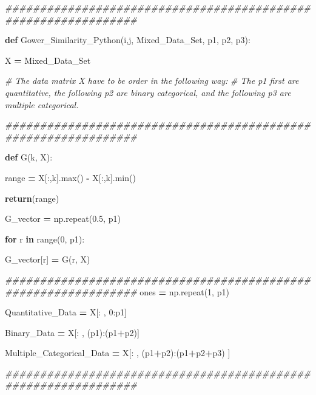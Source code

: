 \documentclass[
  11pt,
  a4paper,
]{article}
\newenvironment{Shaded}{\begin{snugshade}}{\end{snugshade}}
\newcommand{\BuiltInTok}[1]{#1}
\newcommand{\CommentTok}[1]{\textcolor[rgb]{0.56,0.35,0.01}{\textit{#1}}}
\newcommand{\ControlFlowTok}[1]{\textcolor[rgb]{0.13,0.29,0.53}{\textbf{#1}}}
\newcommand{\DecValTok}[1]{\textcolor[rgb]{0.00,0.00,0.81}{#1}}
\newcommand{\FloatTok}[1]{\textcolor[rgb]{0.00,0.00,0.81}{#1}}
\newcommand{\KeywordTok}[1]{\textcolor[rgb]{0.13,0.29,0.53}{\textbf{#1}}}
\newcommand{\NormalTok}[1]{#1}
\newcommand{\OperatorTok}[1]{\textcolor[rgb]{0.81,0.36,0.00}{\textbf{#1}}}
\begin{document}
\begin{Shaded}
\begin{Highlighting}[]
\CommentTok{\#\#\#\#\#\#\#\#\#\#\#\#\#\#\#\#\#\#\#\#\#\#\#\#\#\#\#\#\#\#\#\#\#\#\#\#\#\#\#\#\#\#\#\#\#\#\#\#\#\#\#\#\#\#\#\#\#\#\#\#\#\#\#}


        \KeywordTok{def}\NormalTok{ Gower\_Similarity\_Python(i,j, Mixed\_Data\_Set, p1, p2, p3):}

\NormalTok{            X }\OperatorTok{=}\NormalTok{ Mixed\_Data\_Set}

   \CommentTok{\# The data matrix X have to be order in the following way:}
   \CommentTok{\# The p1 first are quantitative, the following p2 are binary categorical, and the following p3 are multiple categorical.}

\CommentTok{\#\#\#\#\#\#\#\#\#\#\#\#\#\#\#\#\#\#\#\#\#\#\#\#\#\#\#\#\#\#\#\#\#\#\#\#\#\#\#\#\#\#\#\#\#\#\#\#\#\#\#\#\#\#\#\#\#\#\#\#\#\#\#}
        
            \KeywordTok{def}\NormalTok{ G(k, X):}

                \BuiltInTok{range} \OperatorTok{=}\NormalTok{ X[:,k].}\BuiltInTok{max}\NormalTok{() }\OperatorTok{{-}}\NormalTok{ X[:,k].}\BuiltInTok{min}\NormalTok{() }

                \ControlFlowTok{return}\NormalTok{(}\BuiltInTok{range}\NormalTok{)}

\NormalTok{            G\_vector }\OperatorTok{=}\NormalTok{ np.repeat(}\FloatTok{0.5}\NormalTok{, p1)}

            \ControlFlowTok{for}\NormalTok{ r }\KeywordTok{in} \BuiltInTok{range}\NormalTok{(}\DecValTok{0}\NormalTok{, p1):}

\NormalTok{                G\_vector[r] }\OperatorTok{=}\NormalTok{ G(r, X)}
                
      
\CommentTok{\#\#\#\#\#\#\#\#\#\#\#\#\#\#\#\#\#\#\#\#\#\#\#\#\#\#\#\#\#\#\#\#\#\#\#\#\#\#\#\#\#\#\#\#\#\#\#\#\#\#\#\#\#\#\#\#\#\#\#\#\#\#\#    }
\NormalTok{            ones }\OperatorTok{=}\NormalTok{ np.repeat(}\DecValTok{1}\NormalTok{, p1)}

\NormalTok{            Quantitative\_Data }\OperatorTok{=}\NormalTok{ X[: , }\DecValTok{0}\NormalTok{:p1]}

\NormalTok{            Binary\_Data }\OperatorTok{=}\NormalTok{ X[: , (p1):(p1}\OperatorTok{+}\NormalTok{p2)]}
            
\NormalTok{            Multiple\_Categorical\_Data }\OperatorTok{=}\NormalTok{ X[: , (p1}\OperatorTok{+}\NormalTok{p2):(p1}\OperatorTok{+}\NormalTok{p2}\OperatorTok{+}\NormalTok{p3) ]}

\CommentTok{\#\#\#\#\#\#\#\#\#\#\#\#\#\#\#\#\#\#\#\#\#\#\#\#\#\#\#\#\#\#\#\#\#\#\#\#\#\#\#\#\#\#\#\#\#\#\#\#\#\#\#\#\#\#\#\#\#\#\#\#\#\#\#}


\end{Highlighting}
\end{Shaded}
\end{document}
